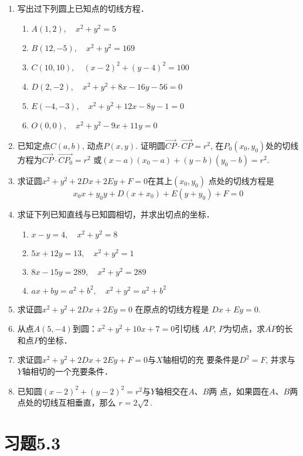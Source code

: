 \begin{ex}
\begin{enumerate}
    \item 写出过下列圆上已知点的切线方程．
\begin{enumerate}
    \item $A(1,2),\quad x^2+y^2=5$
    \item $B(12,-5),\quad x^2+y^2=169$
    \item $C(10,10),\quad (x-2)^2+(y-4)^2=100$
    \item $D(2,-2),\quad x^2+y^2+8x-16y-56=0$
    \item $E(-4,-3),\quad x^2+y^2+12x-8y-1=0$
    \item $O(0,0),\quad x^2+y^2-9x+11y=0$
\end{enumerate}

\item 已知定点$C(a,b)$, 动点$P(x,y)$. 证明圆$\Vec{CP}\cdot\Vec{CP}=r^2$, 在$P_0(x_0,y_0)$处的切线方程为$\Vec{CP}\cdot \Vec{CP_0}=r^2$
或$(x-a)(x_0-a)+(y-b)(y_0-b)=r^2$.
\item 求证圆$x^2+y^2+2Dx+2Ey+F=0$在其上$(x_0,y_0)$
点处的切线方程是
\[x_0x+y_0y+D(x+x_0)+E(y+y_0)+F=0\]
\item 求证下列已知直线与已知圆相切，并求出切点的坐标．
\begin{enumerate}
    \item $x-y=4,\quad x^2+y^2=8$
    \item $5x+12y=13,\quad x^2+y^2=1$
    \item $8x-15y=289,\quad x^2+y^2=289$
    \item $ax+by=a^2+b^2,\quad x^2+y^2=a^2+b^2$
\end{enumerate}

\item 求证圆$x^2+y^2+2Dx+2Ey=0$ 在原点的切线方程是
$Dx+Ey=0$.
\item 从点$A(5,-4)$到圆：$x^2+y^2+10x+7=0$引切线
$AP$, $P$为切点，求$\overline{AP}$的长和点$P$的坐标．
\item 求证圆$x^2+y^2+2Dx+2Ey+F=0$与$X$轴相切的充
要条件是$D^2=F$, 并求与$Y$轴相切的一个充要条件．
\item 已知圆$(x-2)^2+(y-2)^2=r^2$与$Y$轴相交在$A$、$B$两
点，如果圆在$A$、$B$两点处的切线互相垂直，那么
$r=2\sqrt{2}$.
\end{enumerate}   
\end{ex}



\section*{习题5.3}

